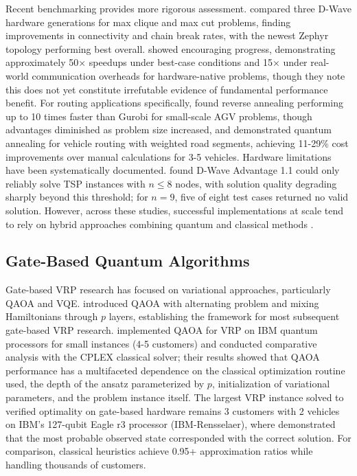 \documentclass[preprint,3p,12pt,authoryear]{elsarticle}
\begin{document}
Recent benchmarking provides more rigorous assessment. \citet{pelofske2025comparing} compared three D-Wave hardware generations for max clique and max cut problems, finding improvements in connectivity and chain break rates, with the newest Zephyr topology performing best overall. \citet{tasseff2024emerging} showed encouraging progress, demonstrating approximately 50× speedups under best-case conditions and 15× under real-world communication overheads for hardware-native problems, though they note this does not yet constitute irrefutable evidence of fundamental performance benefit. For routing applications specifically, \citet{haba2022travel} found reverse annealing performing up to 10 times faster than Gurobi for small-scale AGV problems, though advantages diminished as problem size increased, and \citet{tambunan2023quantum} demonstrated quantum annealing for vehicle routing with weighted road segments, achieving 11-29\% cost improvements over manual calculations for 3-5 vehicles. Hardware limitations have been systematically documented. \citet{jain2021solving} found D-Wave Advantage 1.1 could only reliably solve TSP instances with $n \leq 8$ nodes, with solution quality degrading sharply beyond this threshold; for $n = 9$, five of eight test cases returned no valid solution. However, across these studies, successful implementations at scale tend to rely on hybrid approaches combining quantum and classical methods \citep{kim2025quantum, haba2022travel, tambunan2023quantum}.


\subsection{Gate-Based Quantum Algorithms}
Gate-based VRP research has focused on variational approaches, particularly QAOA and VQE. \cite{farhi2014quantum} introduced QAOA with alternating problem and mixing Hamiltonians through $p$ layers, establishing the framework for most subsequent gate-based VRP research. \cite{azad2022solving} implemented QAOA for VRP on IBM quantum processors for small instances (4-5 customers) and conducted comparative analysis with the CPLEX classical solver; their results showed that QAOA performance has a multifaceted dependence on the classical optimization routine used, the depth of the ansatz parameterized by $p$, initialization of variational parameters, and the problem instance itself. The largest VRP instance solved to verified optimality on gate-based hardware remains 3 customers with 2 vehicles on IBM's 127-qubit Eagle r3 processor (IBM-Rensselaer), where \cite{azfar2025quantum} demonstrated that the most probable observed state corresponded with the correct solution. For comparison, classical heuristics achieve 0.95+ approximation ratios while handling thousands of customers.
\end{document}
